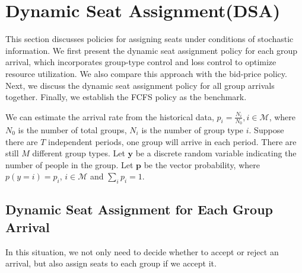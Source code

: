 
\section{Dynamic Seat Assignment(DSA)}
This section discusses policies for assigning seats under conditions of stochastic information. We first present the dynamic seat assignment policy for each group arrival, which incorporates group-type control and loss control to optimize resource utilization. We also compare this approach with the bid-price policy. Next, we discuss the dynamic seat assignment policy for all group arrivals together. Finally, we establish the FCFS policy as the benchmark.



We can estimate the arrival rate from the historical data, $p_i = \frac{N_{i}}{N_{0}}, i \in \mathcal{M}$, where $N_{0}$ is the number of total groups, $N_{i}$ is the number of group type $i$. Suppose there are $T$ independent periods, one group will arrive in each period. There are still $M$ different group types. Let $\mathbf{y}$ be a discrete random variable indicating the number of people in the group. Let $\mathbf{p}$ be the vector probability, where $p(y = i) = p_i$, $i \in \mathcal{M}$ and $\sum_{i} p_{i} =1$.






\subsection{Dynamic Seat Assignment for Each Group Arrival}
In this situation, we not only need to decide whether to accept or reject an arrival, but also assign seats to each group if we accept it.

